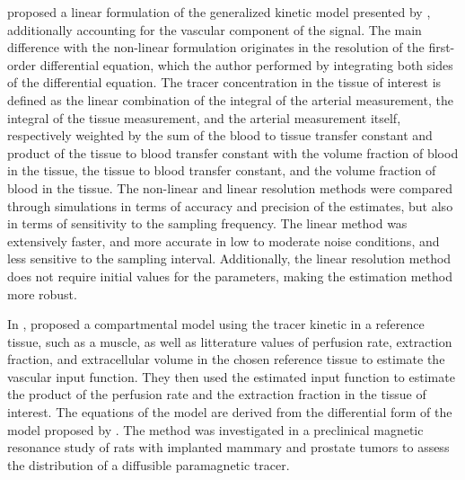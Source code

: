 \citet{Murase:2004kr} proposed a linear formulation of the generalized kinetic model presented by \citet{Tofts:1999ih}, additionally accounting for the vascular component of the signal. 
The main difference with the non-linear formulation originates in the resolution of the first-order differential equation, which the author performed by integrating both sides of the differential equation.
The tracer concentration in the tissue of interest is defined as the linear combination of the integral of the arterial measurement, the integral of the tissue measurement, and the arterial measurement itself, respectively weighted by the sum of the blood to tissue transfer constant and product of the tissue to blood transfer constant with the volume fraction of blood in the tissue, the tissue to blood transfer constant, and the volume fraction of blood in the tissue.
The non-linear and linear resolution methods were compared through simulations in terms of accuracy and precision of the estimates, but also in terms of sensitivity to the sampling frequency.
The linear method was extensively faster, and more accurate in low to moderate noise conditions, and less sensitive to the sampling interval.
Additionally, the linear resolution method does not require initial values for the parameters, making the estimation method more robust.

In \citeyear{Kovar:1998bt}, \citet{Kovar:1998bt} proposed a compartmental model using the tracer kinetic in a reference tissue, such as a muscle, as well as litterature values of perfusion rate, extraction fraction, and extracellular volume in the chosen reference tissue to estimate the vascular input function.
They then used the estimated input function to estimate the product of the perfusion rate and the extraction fraction in the tissue of interest.
The equations of the model are derived from the differential form of the model proposed by \citet{Kety:1951tp}.
The method was investigated in a preclinical magnetic resonance study of rats with implanted mammary and prostate tumors to assess the distribution of a diffusible paramagnetic tracer.

